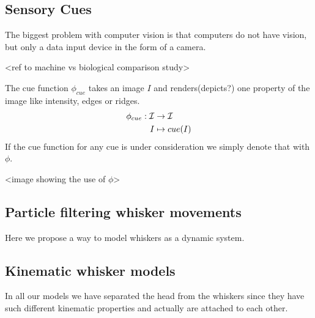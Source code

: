 %
%

%
%

%
%

\subsection{Sensory Cues}

The biggest problem with computer vision is that computers do not have
vision, but only a data input device in the form of a camera. 

<ref to machine vs biological comparison study>


\begin{definition}
    The cue function $\phi_{cue}$ takes an image $I$ and renders(depicts?) one property of the
    image like intensity, edges or ridges.
    \begin{equation}
        \begin{split}
            \phi_{cue} : \mathcal{I} &\rightarrow \mathcal{I}\\
                I &\mapsto cue(I)
        \end{split}
    \end{equation}
    If the cue function for any cue is under consideration we simply denote that with $\phi$.
\end{definition}


<image showing the use of $\phi$>


\subsection{Particle filtering whisker movements}
Here we propose a way to model whiskers as a dynamic system.

\subsection{Kinematic whisker models}

In all our models we have separated the head from the whiskers since they have
such different kinematic properties and actually are attached to each other.


